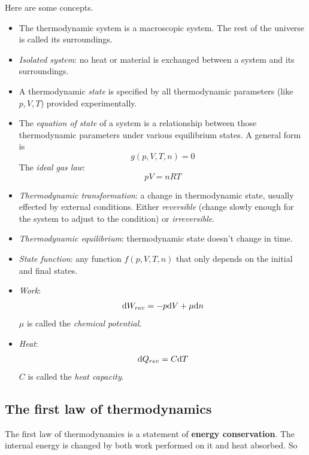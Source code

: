 Here are some concepts.
\begin{itemize}
	\item The thermodynamic system is a macroscopic system. The rest of the universe is called its surroundings.
	\item \textit{Isolated system}: no heat or material is exchanged between a system and its surroundings.
	\item A thermodynamic \textit{state} is specified by all thermodynamic parameters (like $p, V, T$) provided experimentally.
	\item The \textit{equation of state} of a system is a relationship between those thermodynamic parameters under various equilibrium states. A general form is 
	\begin{equation}
		g(p,V,T,n)=0
	\end{equation}
	The \textit{ideal gas law}:
	\begin{equation}
		pV=nRT
	\end{equation}
	\item \textit{Thermodynamic transformation}: a change in thermodynamic state, usually effected by external conditions. Either \textit{reversible} (change slowly enough for the system to adjust to the condition) or \textit{irreversible}.
	\item \textit{Thermodynamic equilibrium}: thermodynamic state doesn't change in time.
	\item \textit{State function}: any function $f(p,V,T,n)$ that only depends on the initial and final states.
	\item \textit{Work}: 
		\begin{equation}
			\mathrm{d} W_{rev}=-p\mathrm{d} V+\mu\mathrm{d} n
		\end{equation}
		$\mu$ is called the \textit{chemical potential}.
	\item \textit{Heat}:
		\begin{equation}
			\mathrm{d} Q_{rev}=C\mathrm{d} T
		\end{equation}
		$C$ is called the \textit{heat capacity}.
\end{itemize}

\subsection{The first law of thermodynamics}

The first law of thermodynamics is a statement of \textbf{energy conservation}. The internal energy is changed by both work performed on it and heat absorbed. So

